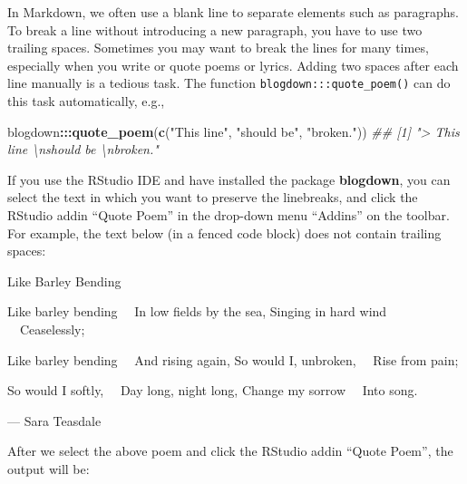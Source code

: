 \documentclass[
  11pt,
]{krantz}
\newenvironment{Shaded}{\begin{snugshade}}{\end{snugshade}}
\newcommand{\CommentTok}[1]{\textcolor[rgb]{0.37,0.37,0.37}{\textit{#1}}}
\newcommand{\KeywordTok}[1]{\textcolor[rgb]{0.27,0.27,0.27}{\textbf{#1}}}
\newcommand{\NormalTok}[1]{#1}
\newcommand{\OperatorTok}[1]{\textcolor[rgb]{0.43,0.43,0.43}{\textbf{#1}}}
\newcommand{\StringTok}[1]{\textcolor[rgb]{0.5,0.5,0.5}{#1}}
\begin{document}
In Markdown, we often use a blank line to separate elements such as paragraphs. To break a line without introducing a new paragraph, you have to use two trailing spaces. Sometimes you may want to break the lines for many times, especially when you write or quote poems or lyrics. Adding two spaces after each line manually is a tedious task. The function \texttt{blogdown:::quote\_poem()} can do this task automatically, e.g.,

\begin{Shaded}
\begin{Highlighting}[]
\NormalTok{blogdown}\OperatorTok{:::}\KeywordTok{quote_poem}\NormalTok{(}\KeywordTok{c}\NormalTok{(}\StringTok{"This line"}\NormalTok{, }\StringTok{"should be"}\NormalTok{, }\StringTok{"broken."}\NormalTok{))}
\CommentTok{## [1] "> This line  \textbackslash{}nshould be  \textbackslash{}nbroken."}
\end{Highlighting}
\end{Shaded}

If you use the RStudio IDE and have installed the package \textbf{blogdown}, you can select the text in which you want to preserve the linebreaks, and click the RStudio addin ``Quote Poem'' in the drop-down menu ``Addins'' on the toolbar. For example, the text below (in a fenced code block) does not contain trailing spaces:

\begin{Shaded}
\begin{Highlighting}[]
\NormalTok{Like Barley Bending}

\NormalTok{Like barley bending}
\NormalTok{　In low fields by the sea,}
\NormalTok{Singing in hard wind}
\NormalTok{　Ceaselessly;}

\NormalTok{Like barley bending}
\NormalTok{　And rising again,}
\NormalTok{So would I, unbroken,}
\NormalTok{　Rise from pain;}

\NormalTok{So would I softly,}
\NormalTok{　Day long, night long,}
\NormalTok{Change my sorrow}
\NormalTok{　Into song.}

\NormalTok{--- Sara Teasdale}
\end{Highlighting}
\end{Shaded}

After we select the above poem and click the RStudio addin ``Quote Poem'', the output will be:
\end{document}
